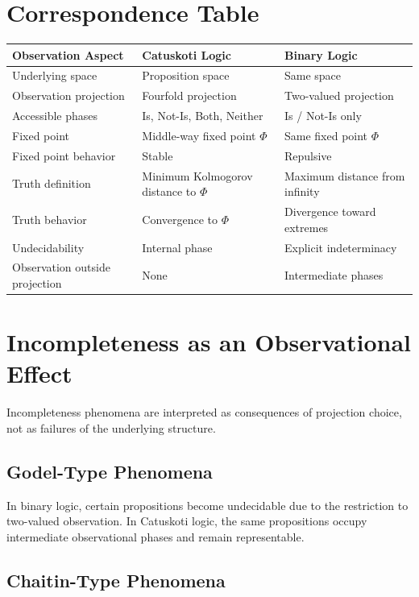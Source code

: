\documentclass[11pt]{article}
\begin{document}
\section{Correspondence Table}

\begin{center}
\begin{tabular}{|l|l|l|}
\hline
Observation Aspect & Catuskoti Logic & Binary Logic \\
\hline
Underlying space & Proposition space & Same space \\
Observation projection & Fourfold projection & Two-valued projection \\
Accessible phases & Is, Not-Is, Both, Neither & Is / Not-Is only \\
Fixed point & Middle-way fixed point $\Phi$ & Same fixed point $\Phi$ \\
Fixed point behavior & Stable & Repulsive \\
Truth definition & Minimum Kolmogorov distance to $\Phi$ & Maximum distance from infinity \\
Truth behavior & Convergence to $\Phi$ & Divergence toward extremes \\
Undecidability & Internal phase & Explicit indeterminacy \\
Observation outside projection & None & Intermediate phases \\
\hline
\end{tabular}
\end{center}

\section{Incompleteness as an Observational Effect}

Incompleteness phenomena are interpreted as consequences of projection choice,
not as failures of the underlying structure.

\subsection{Godel-Type Phenomena}

In binary logic, certain propositions become undecidable due to the restriction
to two-valued observation.
In Catuskoti logic, the same propositions occupy intermediate observational phases
and remain representable.

\subsection{Chaitin-Type Phenomena}
\end{document}
